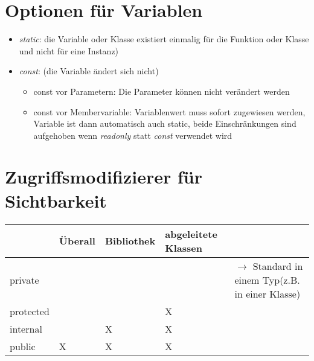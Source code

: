 \section{Optionen für Variablen}
\begin{itemize}
\item \emph{static}: die Variable oder Klasse existiert einmalig für die Funktion oder Klasse und nicht für eine Instanz)
\item \emph{const}: (die Variable ändert sich nicht)
\begin{itemize}
\item const vor Parametern: Die Parameter können nicht verändert werden
\item const vor Membervariable: Variablenwert muss sofort zugewiesen werden, Variable ist dann automatisch auch static, beide Einschränkungen sind aufgehoben wenn \emph{readonly} statt \emph{const} verwendet wird 
\end{itemize}
\end{itemize}

\section{Zugriffsmodifizierer für Sichtbarkeit}

\begin{tabular}{L{.15} | L{.15} L{.15} L{.15} L{.4}}
& Überall & Bibliothek & abgeleitete Klassen & \\\hline
private & ~ & ~ & ~ & $\to$ Standard in einem Typ\newline(z.B. in einer Klasse)\\
protected & ~ & ~ & X & ~\\
internal & ~ & X & X & ~\\
public & X & X & X & ~\\
\end{tabular}

